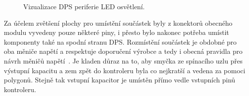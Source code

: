     \begin{figure}[!ht]
        \centering
        \caption{Vizualizace DPS periferie LED osvětlení.}
        \label{fig:perif-led-dps}
    \end{figure}

    Za účelem zvětšení plochy pro umístění součástek byly z konektorů obecného modulu vyvedeny pouze některé piny, i přesto bylo nakonec potřeba umístit komponenty také na spodní stranu DPS. Rozmístění součástek je obdobné pro oba měniče napětí a respektuje doporučení výrobce a tedy i obecná pravidla pro návrh měničů napětí~\cite{TODO}. Je kladen důraz na to, aby smyčka ze spínacího uzlu přes výstupní kapacitu a zem zpět do kontroleru byla co nejkratší a vedena za pomoci polygonů. Stejně tak vstupní kapacitor je umístěn přímo vedle vstupních pinů kontroleru.